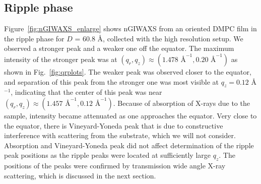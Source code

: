 \subsection{Ripple phase}\label{sec:ripple_phase}
Figure~\ref{fig:nGIWAXS_enlarge} shows nGIWAXS from an oriented DMPC film
in the ripple phase for $D$ = 60.8 \AA, collected with the high resolution setup. 
We observed a stronger peak and a weaker one off the equator. 
The maximum intensity of the stronger peak was at 
$(q_r, q_z) \approx (1.478 \text{ \AA}^{-1}, 0.20 \text{ \AA}^{-1})$ as shown
in Fig.~\ref{fig:qrplots}. The weaker peak was observed closer to the equator, and
separation of this peak from the stronger one was most visible at 
$q_z = 0.12$ \AA$^{-1}$, indicating that the center of this peak was near
$(q_r, q_z) \approx (1.457 \text{ \AA}^{-1}, 0.12 \text{ \AA}^{-1})$. 
Because of absorption of X-rays due to the sample, 
intensity became attenuated as one approaches the equator.
Very close to the equator, there is Vineyard-Yoneda 
peak that is due to constructive interference with scattering from the substrate,
which we will not consider.
Absorption and Vineyard-Yoneda peak did not affect determination of the 
ripple peak positions
as the ripple peaks were located at sufficiently large $q_z$. 
The positions of the peaks were confirmed by transmission wide angle X-ray 
scattering, which is discussed in the next section.

